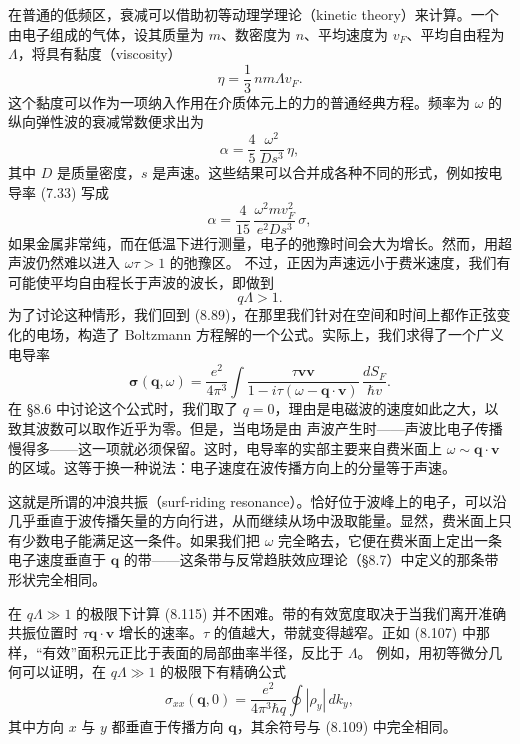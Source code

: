 在普通的低频区，衰减可以借助初等动理学理论（kinetic theory）来计算。一个由电子组成的气体，设其质量为 $m$、数密度为 $n$、平均速度为 $v_F$、平均自由程为 $\Lambda$，将具有黏度（viscosity）
\begin{equation*}
\eta = {\textstyle\frac{1}{3}}\,nm\Lambda v_F. \tag{8.111}
\end{equation*}
这个黏度可以作为一项纳入作用在介质体元上的力的普通经典方程。频率为 $\omega$ 的纵向弹性波的衰减常数便求出为
\begin{equation*}
\alpha = \frac{4}{5}\,\frac{\omega^2}{Ds^3}\,\eta, \tag{8.112}
\end{equation*}
其中 $D$ 是质量密度，$s$ 是声速。这些结果可以合并成各种不同的形式，例如按电导率 (7.33) 写成
\begin{equation*}
\alpha = \frac{4}{15}\,\frac{\omega^2 m v_F^2}{e^2 D s^3}\,\sigma, \tag{8.113}
\end{equation*}
如果金属非常纯，而在低温下进行测量，电子的弛豫时间会大为增长。然而，用超声波仍然难以进入 $\omega\tau>1$ 的弛豫区。
不过，正因为声速远小于费米速度，我们有可能使平均自由程长于声波的波长，即做到
\begin{equation*}
q\Lambda > 1. \tag{8.114}
\end{equation*}
为了讨论这种情形，我们回到 (8.89)，在那里我们针对在空间和时间上都作正弦变化的电场，构造了 Boltzmann 方程解的一个公式。实际上，我们求得了一个广义电导率
\begin{equation*}
\boldsymbol{\sigma}(\mathbf{q},\omega) = \frac{e^2}{4\pi^3}\int \frac{\tau\mathbf{v}\mathbf{v}}{1-i\tau(\omega-\mathbf{q}\cdot\mathbf{v})}\,\frac{dS_F}{\hbar v}. \tag{8.115}
\end{equation*}
在 §8.6 中讨论这个公式时，我们取了 $q=0$，理由是电磁波的速度如此之大，以致其波数可以取作近乎为零。但是，当电场是由
声波产生时——声波比电子传播慢得多——这一项就必须保留。这时，电导率的实部主要来自费米面上 $\omega\sim\mathbf{q}\cdot\mathbf{v}$ 的区域。这等于换一种说法：电子速度在波传播方向上的分量等于声速。

这就是所谓的冲浪共振（surf-riding resonance）。恰好位于波峰上的电子，可以沿几乎垂直于波传播矢量的方向行进，从而继续从场中汲取能量。显然，费米面上只有少数电子能满足这一条件。如果我们把 $\omega$ 完全略去，它便在费米面上定出一条电子速度垂直于 $\mathbf{q}$ 的带——这条带与反常趋肤效应理论（§8.7）中定义的那条带形状完全相同。

在 $q\Lambda\gg1$ 的极限下计算 (8.115) 并不困难。带的有效宽度取决于当我们离开准确共振位置时 $\tau\mathbf{q}\cdot\mathbf{v}$ 增长的速率。$\tau$ 的值越大，带就变得越窄。正如 (8.107) 中那样，“有效”面积元正比于表面的局部曲率半径，反比于 $\Lambda$。
例如，用初等微分几何可以证明，在 $q\Lambda\gg1$ 的极限下有精确公式
\begin{equation*}
\sigma_{xx}(\mathbf{q},0) = \frac{e^2}{4\pi^3\hbar q}\oint |\rho_y|\,dk_y, \tag{8.116}
\end{equation*}
其中方向 $x$ 与 $y$ 都垂直于传播方向 $\mathbf{q}$，其余符号与 (8.109) 中完全相同。

